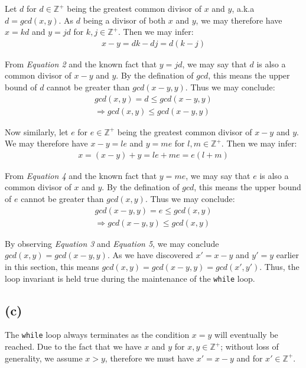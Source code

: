 \documentclass[12pt]{article}
\newcommand{\inlinecode}{\texttt}
\begin{document}
Let $d$ for $d \in \mathbb{Z^+}$ being the greatest common divisor of $x$ and $y$, a.k.a $d = gcd(x, y)$. As $d$ being a divisor of both $x$ and $y$, we may therefore have $x = kd$ and $y = jd$ for $k, j \in \mathbb{Z^+}$. Then we may infer:
\begin{gather}
    x - y = dk - dj = d(k - j)
\end{gather}

From \textit{Equation 2} and the known fact that $y = jd$, we may say that $d$ is also a common divisor of $x - y$ and $y$. By the defination of $gcd$, this means the upper bound of $d$ cannot be greater than $gcd(x-y, y)$. Thus we may conclude:
\begin{gather}
    gcd(x, y) = d \leq gcd(x-y, y) \nonumber \\
    \Rightarrow gcd(x, y) \leq gcd(x-y, y)
\end{gather}

Now similarly, let $e$ for $e \in \mathbb{Z^+}$ being the greatest common divisor of $x-y$ and $y$. We may therefore have $x - y = le$ and $y = me$ for $l, m \in \mathbb{Z^+}$. Then we may infer:
\begin{gather}
    x = (x - y) + y = le + me = e(l + m)
\end{gather}

From \textit{Equation 4} and the known fact that $y = me$, we may say that $e$ is also a common divisor of $x$ and $y$. By the defination of $gcd$, this means the upper bound of $e$ cannot be greater than $gcd(x, y)$. Thus we may conclude:
\begin{gather}
    gcd(x-y, y) = e \leq gcd(x, y) \nonumber  \\
    \Rightarrow gcd(x-y, y) \leq gcd(x, y)
\end{gather}

By observing \textit{Equation 3} and \textit{Equation 5}, we may conclude $gcd(x, y) = gcd(x-y, y)$. As we have discovered $x' = x - y$ and $y' = y$ earlier in this section, this means $gcd(x, y) = gcd(x-y, y) = gcd(x', y')$. Thus, the loop invariant is held true during the maintenance of the \inlinecode{while} loop.

\subsection{(c)}

The \inlinecode{while} loop always terminates as the condition $x = y$ will eventually be reached. Due to the fact that we have $x$ and $y$ for $x, y \in \mathbb{Z^+}$; without loss of generality, we assume $x > y$, therefore we must have $x' = x - y$  and for $x' \in \mathbb{Z^+}$.
\end{document}
